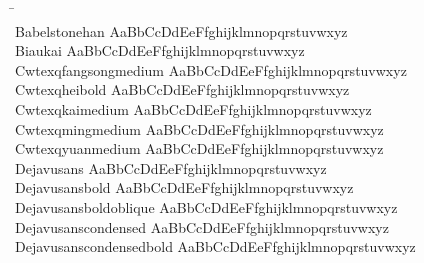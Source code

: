 \begin{tabbing}
\phantom{XXXXXXXXXXXXXXXXXXXXXXXXX} \= \phantom{XXXXXXXXXXXXXXXXXXXXXXXXXXXXXXXXXXXXXXXXXXXXXXXXXXXXXXXXXXXX} \\
Babelstonehan \> { AaBbCcDdEeFfghijklmnopqrstuvwxyz} \\
Biaukai \> { AaBbCcDdEeFfghijklmnopqrstuvwxyz} \\
Cwtexqfangsongmedium \> { AaBbCcDdEeFfghijklmnopqrstuvwxyz} \\
Cwtexqheibold \> { AaBbCcDdEeFfghijklmnopqrstuvwxyz} \\
Cwtexqkaimedium \> { AaBbCcDdEeFfghijklmnopqrstuvwxyz} \\
Cwtexqmingmedium \> { AaBbCcDdEeFfghijklmnopqrstuvwxyz} \\
Cwtexqyuanmedium \> { AaBbCcDdEeFfghijklmnopqrstuvwxyz} \\
Dejavusans \> { AaBbCcDdEeFfghijklmnopqrstuvwxyz} \\
Dejavusansbold \> { AaBbCcDdEeFfghijklmnopqrstuvwxyz} \\
Dejavusansboldoblique \> { AaBbCcDdEeFfghijklmnopqrstuvwxyz} \\
Dejavusanscondensed \> { AaBbCcDdEeFfghijklmnopqrstuvwxyz} \\
Dejavusanscondensedbold \> { AaBbCcDdEeFfghijklmnopqrstuvwxyz} \\

\end{tabbing}
